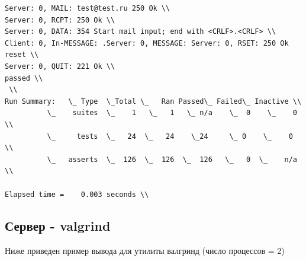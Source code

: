 \documentclass[a4paper,12pt]{report}
\begin{document}
\begin{verbatim}
Server: 0, MAIL: test@test.ru 250 Ok \\
Server: 0, RCPT: 250 Ok \\
Server: 0, DATA: 354 Start mail input; end with <CRLF>.<CRLF> \\
Client: 0, In-MESSAGE: .Server: 0, MESSAGE: Server: 0, RSET: 250 Ok reset \\
Server: 0, QUIT: 221 Ok \\
passed \\
 \\
Run Summary:   \_ Type  \_Total \_   Ran Passed\_ Failed\_ Inactive \\
          \_    suites  \_    1   \_   1   \_ n/a    \_  0    \_    0 \\
          \_     tests  \_   24  \_   24    \_24     \_ 0    \_    0 \\
          \_   asserts  \_  126  \_  126  \_  126   \_   0  \_    n/a \\

Elapsed time =    0.003 seconds \\

\end{verbatim}
\subsection*{Сервер - valgrind}
Ниже приведен пример вывода для утилиты валгринд (число процессов = 2) \\
\end{document}
